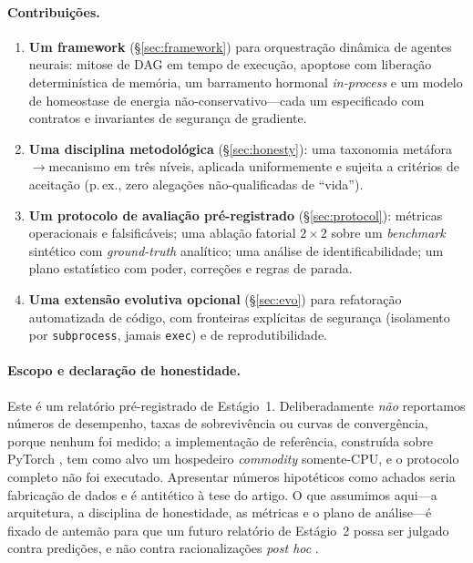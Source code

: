 \documentclass[11pt]{article}
\begin{document}
\paragraph{Contribuições.}
\begin{enumerate}[leftmargin=1.4em,itemsep=2pt]
\item \textbf{Um framework} (\S\ref{sec:framework}) para orquestração dinâmica de
agentes neurais: mitose de DAG em tempo de execução, apoptose com liberação
determinística de memória, um barramento hormonal \emph{in-process} e um modelo
de homeostase de energia não-conservativo---cada um especificado com contratos e
invariantes de segurança de gradiente.
\item \textbf{Uma disciplina metodológica} (\S\ref{sec:honesty}): uma taxonomia
metáfora$\rightarrow$mecanismo em três níveis, aplicada uniformemente e sujeita a
critérios de aceitação (p.\,ex., zero alegações não-qualificadas de ``vida'').
\item \textbf{Um protocolo de avaliação pré-registrado} (\S\ref{sec:protocol}):
métricas operacionais e falsificáveis; uma ablação fatorial $2\times2$ sobre um
\emph{benchmark} sintético com \emph{ground-truth} analítico; uma análise de
identificabilidade; um plano estatístico com poder, correções e regras de parada.
\item \textbf{Uma extensão evolutiva opcional} (\S\ref{sec:evo}) para
refatoração automatizada de código, com fronteiras explícitas de segurança
(isolamento por \texttt{subprocess}, jamais \texttt{exec}) e de reprodutibilidade.
\end{enumerate}

\paragraph{Escopo e declaração de honestidade.}
Este é um relatório pré-registrado de Estágio~1. Deliberadamente \emph{não}
reportamos números de desempenho, taxas de sobrevivência ou curvas de
convergência, porque nenhum foi medido; a implementação de referência, construída
sobre PyTorch \cite{paszke2019pytorch}, tem como alvo um hospedeiro \emph{commodity}
somente-CPU, e o protocolo completo não foi executado. Apresentar números
hipotéticos como achados seria fabricação de dados e é antitético à tese do
artigo. O que assumimos aqui---a arquitetura, a disciplina de honestidade, as
métricas e o plano de análise---é fixado de antemão para que um futuro relatório
de Estágio~2 possa ser julgado contra predições, e não contra racionalizações
\emph{post hoc} \cite{chambers2013registered,pineau2021repro}.
\end{document}
